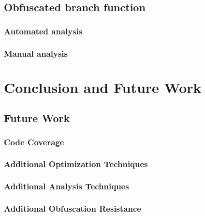\documentclass[10pt,twoside,a4paper,bibliography=totoc]{scrbook}
\begin{document}
\section{Obfuscated branch function}
\subsection{Automated analysis}
\subsection{Manual analysis}

\fancyhead[RE]{\leftmark}
%
% 


\chapter{Conclusion and Future Work}
\label{sec5:conclusion_and_future_work}


\section{Future Work}
\subsection{Code Coverage}

\subsection{Additional Optimization Techniques}

\subsection{Additional Analysis Techniques}

\subsection{Additional Obfuscation Resistance}
\end{document}
